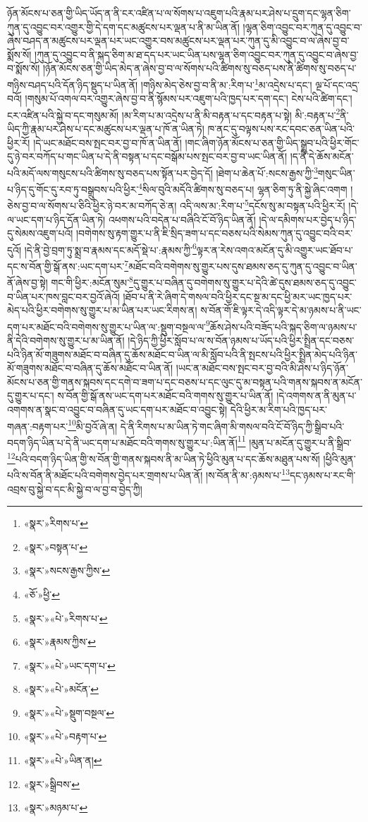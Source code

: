 ཉོན་མོངས་པ་ཅན་གྱི་ཡིད་ཡོད་ན་ནི་ངར་འཛིན་པ་ལ་སོགས་པ་འཇུག་པའི་རྣམ་པར་ཤེས་པ་དྲུག་དང་ལྷན་ཅིག་ཀུན་དུ་འབྱུང་བར་འགྱུར་གྱི་དེ་དག་དང་མཚུངས་པར་ལྡན་པ་ནི་མ་ཡིན་ནོ། །ལྷན་ཅིག་འབྱུང་བར་ཀུན་དུ་འབྱུང་བ་ཞེས་བཤད་ན་མཚུངས་པར་ལྡན་པར་ཡང་འགྱུར་བས་མཚུངས་པར་ལྡན་པར་ཀུན་དུ་མི་འབྱུང་བ་ལ་ཞེས་བྱ་བ་སྨོས་སོ། །ཀུན་དུ་འབྱུང་བ་ནི་སྐད་ཅིག་མ་ཐ་དད་པར་ཡང་ཡིན་པས་ལྷན་ཅིག་འབྱུང་བར་ཀུན་དུ་འབྱུང་བ་ཞེས་བྱ་བ་སྨོས་སོ། །ཉོན་མོངས་ཅན་གྱི་ཡིད་མེད་ན་ཞེས་བྱ་བ་ལ་སོགས་པའི་ཚིགས་སུ་བཅད་པས་ནི་ཚིགས་སུ་བཅད་པ་གཉིས་བཤད་པའི་དོན་ཉིད་སྡུད་པ་ཡིན་ནོ། །གཉིས་མེད་ཅེས་བྱ་བ་ནི་མ་:རིག་པ་\footnote{«སྣར་»རིགས་པ་}མ་འདྲེས་པ་དང་། ལྔ་པོ་དང་འདྲ་བའོ། །གསུམ་པོ་འགལ་བར་འགྱུར་ཞེས་བྱ་བ་ནི་སྙོམས་པར་འཇུག་པའི་ཁྱད་པར་དག་དང་། ངེས་པའི་ཚིག་དང་། ངར་འཛིན་པའི་སྐྱེ་བ་དང་གསུམ་མོ། །མ་རིག་པ་མ་འདྲེས་པ་ནི་མི་བརྟན་པ་དང་བརྟན་པ་སྟེ། མི་:བརྟན་པ་\footnote{«སྣར་»བསྟན་པ་}ནི་ཡིད་ཀྱི་རྣམ་པར་ཤེས་པ་དང་མཚུངས་པར་ལྡན་པ་ཁོ་ན་ཡིན་ཏེ། ཁ་ནང་དུ་བལྟས་པས་རང་དབང་ཅན་ཡིན་པའི་ཕྱིར་རོ། །དེ་ཡང་མཐོང་བས་སྤང་བར་བྱ་བ་ཁོ་ན་ཡིན་ནོ། །གང་ཞིག་ཉོན་མོངས་པ་ཅན་གྱི་ཡིད་སྒྲུབ་པའི་ཕྱིར་གོང་དུ་ཉེ་བར་བཀོད་པ་གང་ཡིན་པ་དེ་ནི་བསྟན་པ་དང་བསྒོམ་པས་སྤང་བར་བྱ་བ་ཡང་ཡིན་ནོ། །ད་ནི་དེ་ཆོས་མངོན་པའི་མདོ་ལས་གསུངས་པའི་ཚིགས་སུ་བཅད་པས་སྟོན་པར་བྱེད་དོ། །ཐེག་པ་ཆེན་པོ་:སངས་རྒྱས་ཀྱི་\footnote{«སྣར་»སངས་རྒྱས་ཀྱིས་}གསུང་ཡིན་པ་ཉིད་དུ་གོང་དུ་རབ་ཏུ་བསྒྲུབས་པའི་ཕྱིར་\footnote{«ཅོ་»ཕྱི་}སིལ་བུའི་མདོའི་ཚིགས་སུ་བཅད་པ། ལྷན་ཅིག་ཏུ་ནི་སྐྱེ་ཞིང་འགག །ཅེས་བྱ་བ་ལ་སོགས་པ་ཅིའི་ཕྱིར་ཉེ་བར་མ་བཀོད་ཅེ་ན། འདི་ལས་མ་:རིག་པ་\footnote{«སྣར་»«པེ་»རིགས་པ་}དངོས་སུ་མ་བསྟན་པའི་ཕྱིར་རོ། །དེ་ལ་ཡང་དག་པ་ཉིད་དོན་ཡིན་ཏེ། འཕགས་པའི་བདེན་པ་བཞིའི་ངོ་བོ་ཉིད་ཡིན་ནོ། །དེ་ལ་དམིགས་པར་བྱེད་པ་ཉིད་དུ་སེམས་འཇུག་པའོ། །བགེགས་སུ་རྟག་གྱུར་པ་ནི་ཇི་སྲིད་ཟག་པ་དང་བཅས་པའི་སེམས་ཀུན་དུ་འབྱུང་བའི་བར་དུའོ། །དེ་ནི་བྱེ་བྲག་ཏུ་སྨྲ་བ་རྣམས་དང་མདོ་སྡེ་པ་:རྣམས་ཀྱི་\footnote{«སྣར་»རྣམས་ཀྱིས་}ལྟར་ན་རེས་འགའ་མངོན་དུ་མི་འགྱུར་ཡང་ཐོབ་པ་དང་ས་བོན་གྱི་སྒོ་ནས་:ཡང་དག་པར་\footnote{«སྣར་»«པེ་»ཡང་དག་པ་}མཐོང་བའི་བགེགས་སུ་གྱུར་པས་དུས་ཐམས་ཅད་དུ་ཀུན་དུ་འབྱུང་བ་ཡིན་ནོ་ཞེས་བྱ་སྟེ། གང་གི་ཕྱིར་:མངོན་སུམ་\footnote{«སྣར་»«པེ་»མངོན་}དུ་གྱུར་པ་བཞིན་དུ་བགེགས་སུ་གྱུར་པ་དེའི་ཚེ་དུས་ཐམས་ཅད་དུ་འབྱུང་བ་ཡིན་པར་ཁས་བླང་བར་བྱའོ་ཞེའོ། །ཐོབ་པ་ནི་རེ་ཞིག་དེ་གསལ་བའི་ཕྱིར་དང་སྔ་མ་དང་ཕྱི་མར་ཡང་ཁྱད་པར་མེད་པའི་ཕྱིར་བགེགས་སུ་གྱུར་པ་མ་ཡིན་པར་ཡང་རིགས་ན། ས་བོན་གོ་ཇི་ལྟར་དེ་འདི་ལྟར་དེ་མ་ཉམས་པ་ནི་ཡང་དག་པར་མཐོང་བའི་བགེགས་སུ་གྱུར་པ་ཡིན་ལ་:སྡུག་བསྔལ་ལ་\footnote{«སྣར་»«པེ་»སྡུག་བསྔལ་}ཆོས་ཤེས་པའི་བཟོད་པའི་སྐད་ཅིག་ལ་ཉམས་པ་ནི་དེའི་བགེགས་སུ་གྱུར་པ་མ་ཡིན་ནོ། །དེ་ཉིད་ཀྱི་ཕྱིར་སློབ་པ་ལ་ས་བོན་ཉམས་པ་ཡོད་པའི་ཕྱིར་སྤྲིན་དང་བཅས་པའི་ཉིན་མོ་གཟུགས་མཐོང་བ་བཞིན་དུ་ཆོས་མཐོང་བ་ཡིན་ལ་མི་སློབ་པའི་ནི་སྤངས་པའི་ཕྱིར་སྤྲིན་མེད་པའི་ཉིན་མོ་གཟུགས་མཐོང་བ་བཞིན་དུ་ཆོས་མཐོང་བ་ཡིན་ནོ། །ཡང་ན་མཐོང་བས་སྤང་བར་བྱ་བའི་མི་ཤེས་པ་ཉིད་ཉོན་མོངས་པ་ཅན་གྱི་གནས་སྐབས་དང་དགེ་བ་ཟག་པ་དང་བཅས་པ་དང་ལུང་དུ་མ་བསྟན་པའི་གནས་སྐབས་ན་མངོན་དུ་གྱུར་པ་དང་། ས་བོན་གྱི་སྒོ་ནས་ཡང་དག་པར་མཐོང་བའི་གགས་སུ་གྱུར་པ་ཡིན་ནོ། །དེ་འགགས་ན་ནི་མུན་པ་འགགས་ན་སྣང་བ་འབྱུང་བ་བཞིན་དུ་ཡང་དག་པར་མཐོང་བ་འབྱུང་སྟེ། དེའི་ཕྱིར་མ་རིག་པའི་ཁྱད་པར་གཞན་:བརྟག་པར་\footnote{«སྣར་»«པེ་»བརྟག་པ་}མི་བྱའོ་ཞེ་ན། དེ་ནི་རིགས་པ་མ་ཡིན་ཏེ་གང་ཞིག་མི་གསལ་བའི་ངོ་བོ་ཉིད་ཀྱི་སྒྲིབ་པའི་བདག་ཉིད་ཡིན་པ་དེ་ནི་ཡང་དག་པ་མཐོང་བའི་གགས་སུ་གྱུར་པ་:ཡིན་ནོ།\footnote{«སྣར་»«པེ་»ཡིན་ན།} །མུན་པ་མངོན་དུ་གྱུར་པ་ནི་སྒྲིབ་\footnote{«སྣར་»སྒྲིབས་}པའི་བདག་ཉིད་ཡིན་གྱི་ས་བོན་གྱི་གནས་སྐབས་ནི་མ་ཡིན་ཏེ་ཕྱིའི་མུན་པ་དང་ཆོས་མཐུན་པས་སོ། །ཕྱིའི་མུན་པའི་ས་བོན་ནི་མཐོང་པའི་བགེགས་བྱེད་པར་གྲགས་པ་ཡིན་ནོ། །ས་བོན་ནི་མ་:ཉམས་པ་\footnote{«སྣར་»མཉམ་པ་}དང་ཉམས་པ་རང་གི་འབྲས་བུ་སྐྱེ་བ་དང་མི་སྐྱེ་བ་ལ་བྱ་བ་བྱེད་ཀྱི། 